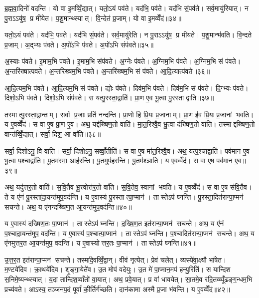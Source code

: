 ब्र॒ह्म॒वा॒दिनो॑ वदन्ति। यो वा इ॒मव्विँ॒द्यात्। यतो॒ऽयं पव॑ते। यद॑भि॒ पव॑ते। यद॑भि सं॒पव॑ते। सर्व॒मायु॑रियात्। न पु॒राऽऽयु॑ष॒ प्र मी॑येत। प॒शु॒मान्थ्स्यात्। वि॒न्देत॑ प्र॒जाम्। यो वा इ॒मव्वेँद॑॥३४॥

यतो॒ऽयं पव॑ते। यद॑भि॒ पव॑ते। यद॑भि सं॒पव॑ते। सर्व॒मायु॑रेति। न पु॒राऽऽयु॑ष॒ प्र मी॑यते। प॒शु॒मान्भ॑वति। वि॒न्दते प्र॒जाम्। अ॒द्भ्यः प॑वते। अ॒पो॑ऽभि प॑वते। अ॒पो॑ऽभि संप॑वते॥३५॥

अ॒स्याः प॑वते। इ॒माम॒भि प॑वते। इ॒माम॒भि संप॑वते। अ॒ग्नेः प॑वते। अ॒ग्निम॒भि प॑वते। अ॒ग्निम॒भि सं प॑वते। अ॒न्तरि॑ख्षात्पवते। अ॒न्तरि॑ख्षम॒भि प॑वते। अ॒न्तरि॑ख्षम॒भि सं प॑वते। आ॒दि॒त्यात्प॑वते॥३६॥

आ॒दि॒त्यम॒भि प॑वते। आ॒दि॒त्यम॒भि सं प॑वते। द्योः प॑वते। दिव॑म॒भि प॑वते। दिव॑म॒भि सं प॑वते। दि॒ग्भ्यः प॑वते। दिशो॒ऽभि प॑वते। दिशो॒ऽभि संप॑वते। स यत्पु॒रस्ता॒द्वाति॑। प्रा॒ण ए॒व भू॒त्वा पु॒रस्ताद्वाति॥३७॥

तस्मात्पु॒रस्ता॒द्वान्तम्। सर्वा प्र॒जाः प्रति॑ नन्दन्ति। प्रा॒णो हि प्रि॒यः प्र॒जानाम्। प्रा॒ण इ॑व प्रि॒यः प्र॒जानां भवति। य ए॒वव्वेँद॑। स वा ए॒ष प्रा॒ण ए॒व। अथ॒ यद्द॑ख्षिण॒तो वाति॑। मा॒त॒रिश्वै॒व भू॒त्वा द॑ख्षिण॒तो वा॑ति। तस्माद्दख्षिण॒तो वान्त॑व्विँ॒द्यात्। सर्वा॒ दिश॒ आ वा॑ति॥३८॥

सर्वा॒ दिशोऽनु॒ वि वा॑ति। सर्वा॒ दिशोऽनु॒ सव्वाँ॒तीति॑। स वा ए॒ष मा॑त॒रिश्वै॒व। अथ॒ यत्प॒श्चाद्वाति॑। पव॑मान ए॒व भू॒त्वा प॒श्चाद्वा॑ति। पू॒तम॑स्मा॒ आह॑रन्ति। पू॒तमुप॑हरन्ति। पू॒तम॑श्ञाति। य ए॒वव्वेँद॑। स वा ए॒ष पव॑मान ए॒व॥३९॥

अथ॒ यदु॑त्तर॒तो वाति॑। स॒वि॒तैव भू॒त्त्वोत्त॑र॒तो वा॑ति। स॒वि॒तेव॒ स्वानां भवति। य ए॒वव्वेँद॑। स वा ए॒ष स॑वि॒तैव। ते य ए॑नं पु॒रस्ता॑दा॒यन्त॑मुप॒वद॑न्ति। य ए॒वास्य॑ पु॒रस्तात्पा॒प्मान॑। तास्तेऽप॑ घ्नन्ति। पु॒रस्ता॒दित॑रान्पा॒प्मन॑ सचन्ते। अथ॒ य ए॑नन्दख्षिण॒त आ॒यन्त॑मुप॒वद॑न्ति॥४०॥

य ए॒वास्य॑ दख्षिण॒तः पा॒प्मान॑। तास्तेऽप॑ घ्नन्ति। द॒ख्षि॒ण॒त इत॑रान्पा॒प्मन॑ सचन्ते। अथ॒ य ए॑नं प॒श्चादा॒यन्त॑मुप॒ वद॑न्ति। य ए॒वास्य॑ प॒श्चात्पा॒प्मान॑। तास्तेऽप॑ घ्नन्ति। प॒श्चादित॑रान्पा॒प्मन॑ सचन्ते। अथ॒ य ए॑नमुत्तर॒त आ॒यन्त॑मुप॒ वद॑न्ति। य ए॒वास्योत्तर॒तः पा॒प्मान॑। तास्तेऽप॑ घ्नन्ति॥४१॥

उ॒त्त॒र॒त इत॑रान्पा॒प्मन॑ सचन्ते। तस्मा॑दे॒वव्विँ॒द्वान्। वीव॑ नृत्येत्। प्रेव॑ चलेत्। व्यस्ये॑वा॒क्ष्यौ भा॑षेत। म॒ण्टये॑दिव। क्रा॒थये॑दिव। शृ॒ङ्गा॒येते॑व। उ॒त मोप॑ वदेयुः। उ॒त मे॑ पा॒प्मान॒मप॑ हन्यु॒रिति॑। स यान्दिश स॒निमे॒ष्यन्थ्स्यात्। य॒दा तान्दिश॒व्वाँतो॑ वा॒यात्। अथ॒ प्रवे॒यात्। प्र वा॑ धावयेत्। सा॒तमे॒व र॑दि॒तव्व्यूँ॑ढङ्ग॒न्धम॒भि प्रच्य॑वते। आऽस्य॒ तञ्ज॑नप॒दं पूर्वा॑ की॒र्तिर्ग॑च्छति। दान॑कामा अस्मै प्र॒जा भ॑वन्ति। य ए॒वव्वेँद॑॥४२॥\anuvakamend[वेद॒ सं प॑वत आदि॒त्यात्प॑वते वा॒त्या वात्ये॒ष पव॑मान ए॒व द॑ख्षिण॒त आ॒यन्त॑मुप॒ वद॑न्त्युत्तर॒तः पा॒प्मान॒स्ता स्तेप॑ घ्न॒न्तीत्य॒ष्टौ च॑]

